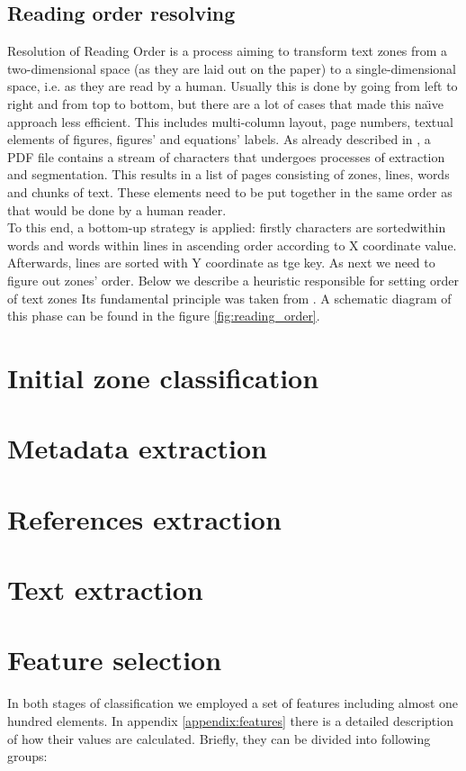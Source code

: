\subsection{Reading order resolving}
Resolution of Reading Order is a process aiming to transform text zones from a two-dimensional space (as they are laid out on the paper) to a single-dimensional space, i.e. as they are read by a human. Usually this is done by going from left to right and from top to bottom, but there are a lot of cases that made this na\"\i ve approach less efficient. This includes multi-column layout, page numbers, textual elements of figures, figures' and equations' labels.
\qquad
As already described in \cite{DominikaTkaczykPaweSzostekMateuszFedoryszakPiotrJanDendek2014}, a PDF file contains a stream of characters that undergoes processes of extraction and segmentation. This results in a list of pages consisting of zones, lines, words and chunks of text. These elements need to be put together in the same order as that would be done by a human reader.\\
To this end, a bottom-up strategy is applied: firstly characters are sortedwithin words and words within lines in ascending order according to X coordinate value. Afterwards, lines are sorted with Y coordinate as tge key. As next we need to figure out zones' order. Below we describe a heuristic responsible for setting order of text zones Its fundamental principle was taken from \cite{ROR_source}. A schematic diagram of this phase can be found in the figure \ref{fig:reading_order}.
\section{Initial zone classification}
\section{Metadata extraction}
\section{References extraction}
\section{Text extraction}
\section{Feature selection}
In both stages of classification we employed a set of features including almost one hundred elements. In appendix \ref{appendix:features} there is a detailed description of how their values are calculated. Briefly, they can be divided into following groups:
